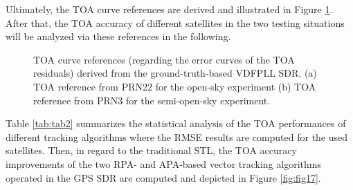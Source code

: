 \documentclass{article}
\newcommand{\reffig}[1]{Figure \ref{#1}}
\begin{document}
Ultimately, the TOA curve references are derived and illustrated in \reffig{fig:fig16}. After that, the TOA accuracy of different satellites in the two testing situations will be analyzed via these references in the following. 

\begin{figure}[htbp]%
\centering
{}%
\hfil
{}%
\caption{TOA curve references (regarding the error curves of the TOA residuals) derived from the ground-truth-based VDFPLL SDR. (a) TOA reference from PRN22 for the open-sky experiment (b) TOA reference from PRN3 for the semi-open-sky experiment. }%
\label{fig:fig16}%
\end{figure}


Table \ref{tab:tab2} summarizes the statistical analysis of the TOA performances of different tracking algorithms where the RMSE results are computed for the used satellites. Then, in regard to the traditional STL, the TOA accuracy improvements of the two RPA- and APA-based vector tracking algorithms operated in the GPS SDR are computed and depicted in \reffig{fig:fig17}. 
\end{document}
